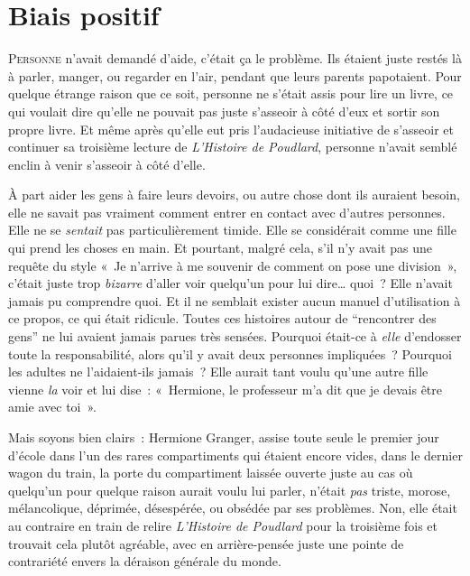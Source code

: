 
\chapter{Biais positif}

\lettrine{P}{ersonne} n'avait demandé d'aide, c'était ça le problème.
Ils étaient juste restés là à parler, manger, ou regarder en l'air, pendant que leurs parents papotaient.
Pour quelque étrange raison que ce soit, personne ne s'était assis pour lire un livre, ce qui voulait dire qu'elle ne pouvait pas juste s'asseoir à côté d'eux et sortir son propre livre.
Et même après qu'elle eut pris l'audacieuse initiative de s'asseoir et continuer sa troisième lecture de \emph{L'Histoire de Poudlard}, personne n'avait semblé enclin à venir s'asseoir à côté d'elle.

À part aider les gens à faire leurs devoirs, ou autre chose dont ils auraient besoin, elle ne savait pas vraiment comment entrer en contact avec d'autres personnes.
Elle ne se \emph{sentait} pas particulièrement timide.
Elle se considérait comme une fille qui prend les choses en main.
Et pourtant, malgré cela, s'il n'y avait pas une requête du style «~Je n'arrive à me souvenir de comment on pose une division~», c'était juste trop \emph{bizarre} d'aller voir quelqu'un pour lui dire… quoi~?
Elle n'avait jamais pu comprendre quoi.
Et il ne semblait exister aucun manuel d'utilisation à ce propos, ce qui était ridicule.
Toutes ces histoires autour de “rencontrer des gens” ne lui avaient jamais parues très sensées.
Pourquoi était-ce à \emph{elle} d'endosser toute la responsabilité, alors qu'il y avait deux personnes impliquées~?
Pourquoi les adultes ne l'aidaient-ils jamais~?
Elle aurait tant voulu qu'une autre fille vienne \emph{la} voir et lui dise~: «~Hermione, le professeur m'a dit que je devais être amie avec toi~».

Mais soyons bien clairs~: Hermione Granger, assise toute seule le premier jour d'école dans l'un des rares compartiments qui étaient encore vides, dans le dernier wagon du train, la porte du compartiment laissée ouverte juste au cas où quelqu'un pour quelque raison aurait voulu lui parler, n'était \emph{pas} triste, morose, mélancolique, déprimée, désespérée, ou obsédée par ses problèmes.
Non, elle était au contraire en train de relire \emph{L'Histoire de Poudlard} pour la troisième fois et trouvait cela plutôt agréable, avec en arrière-pensée juste une pointe de contrariété envers la déraison générale du monde.

